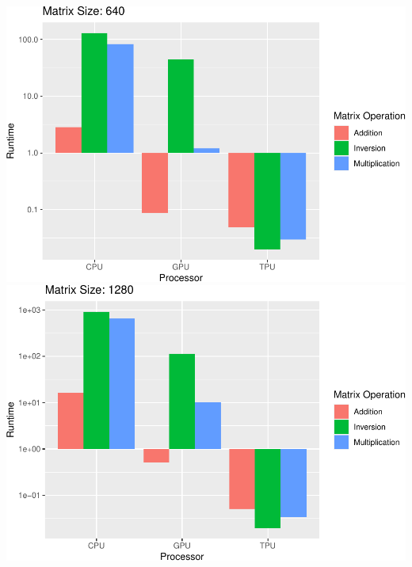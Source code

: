 \documentclass[
]{article}
\begin{document}
\includegraphics{main_files/figure-latex/unnamed-chunk-8-7.pdf}
\includegraphics{main_files/figure-latex/unnamed-chunk-8-8.pdf}
\end{document}
